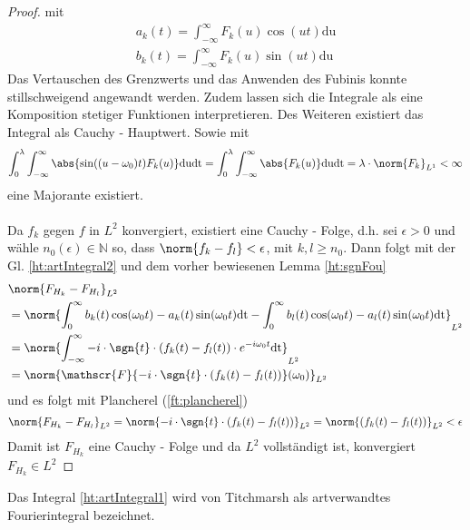 \begin{lemma}
\begin{proof}
	mit
	\begin{align}
		a_k(t) = \int_{-\infty}^{\infty} F_k(u) \cos(u t) \mathrm{du}\\
		b_k(t) =  \int_{-\infty}^{\infty} F_k(u) \sin(u t) \mathrm{du}
	\end{align}
	Das Vertauschen des Grenzwerts und das Anwenden des Fubinis konnte stillschweigend angewandt werden. Zudem lassen sich die Integrale als eine Komposition stetiger Funktionen interpretieren. Des Weiteren existiert das Integral als Cauchy - Hauptwert. Sowie mit
	\begin{align}
	\int_0^{\lambda} \int_{-\infty}^{\infty} \abs{\sin((u-\omega_0) t) F_k(u)} \mathrm{du} \mathrm{dt}
	= \int_0^{\lambda} \int_{-\infty}^{\infty} \abs{F_k(u)} \mathrm{du} \mathrm{dt} = \lambda \cdot \norm{F_k}_{L^1} < \infty
	\end{align}
	eine Majorante existiert.\\\\
	Da $f_k$ gegen $f$ in $L^2$ konvergiert, existiert eine Cauchy - Folge, d.h. sei $\epsilon > 0$ und wähle $n_0(\epsilon) \in \mathbb{N}$ so, dass $\norm{f_k - f_l} <  \epsilon$, mit $k, l \geq n_0$. Dann folgt mit der Gl. \ref{ht:artIntegral2} und dem vorher bewiesenen Lemma \ref{ht:sgnFou}  
	\begin{align}
	&\norm{F_{H_k} - F_{H_l}}_{L^2} \\
	&=\norm{\int_{0}^{\infty} b_k(t) \cos(\omega_0 t)  - a_k(t) \sin(\omega_0 t)  \mathrm{dt} - \int_{0}^{\infty} b_l(t) \cos(\omega_0 t)  - a_l(t) \sin(\omega_0 t)  \mathrm{dt}}_{L^2} \\
	&=\norm{ \int_{-\infty}^{\infty} - i \cdot \sgn{t} \cdot  (f_k(t) - f_l(t)) \cdot  e^{- i \omega_0 t}  \mathrm{dt}}_{L^2}\\
	&=\norm{ \mathscr{F}\{-i \cdot \sgn{t} \cdot (f_k(t) - f_l(t))\}(\omega_0)}_{L^2}
	\end{align}
	und es folgt mit Plancherel (\ref{ft:plancherel})
	\begin{align}
	\norm{F_{H_k} - F_{H_l}}_{L^2} = \norm{-i \cdot \sgn{t} \cdot (f_k(t) - f_l(t))}_{L^2} = \norm{(f_k(t) - f_l(t))}_{L^2} < \epsilon
	\end{align}
	Damit ist $F_{H_k}$ eine Cauchy - Folge und da $L^2$ vollständigt ist, konvergiert $F_{H_k} \in L^2$
\end{proof}
\end{lemma}
\begin{bem}
Das Integral \ref{ht:artIntegral1} wird von Titchmarsh \cite[Seite 119]{titch1948} als artverwandtes Fourierintegral bezeichnet.
\end{bem}
